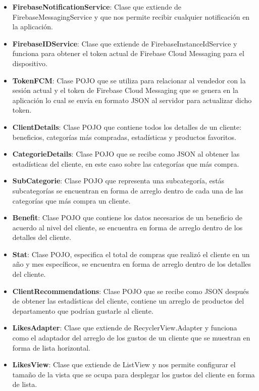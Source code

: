 \begin{itemize}
\item \textbf{FirebaseNotificationService}: Clase que extiende de FirebaseMessagingService y que nos permite recibir cualquier notificación en la aplicación.
\item \textbf{FirebaseIDService}: Clase que extiende de FirebaseInstanceIdService y funciona para obtener el token actual de Firebase Cloud Messaging para el dispositivo.
\item \textbf{TokenFCM}: Clase POJO que se utiliza para relacionar al vendedor con la sesión actual y el token de Firebase Cloud Messaging que se genera en la aplicación lo cual se envía en formato JSON al servidor para actualizar dicho token.
\item \textbf{ClientDetails}: Clase POJO que contiene todos los detalles de un cliente: beneficios, categorías más compradas, estadísticas y productos favoritos.
\item \textbf{CategorieDetails}: Clase POJO que se recibe como JSON al obtener las estadísticas del cliente, en este caso sobre las categorías que más compra. 
\item \textbf{SubCategorie}: Clase POJO que representa una subcategoría, estás subcategorías se encuentran en forma de arreglo dentro de cada una de las categorías que más compra un cliente.
\item \textbf{Benefit}: Clase POJO que contiene los datos necesarios de un beneficio de acuerdo al nivel del cliente, se encuentra en forma de arreglo dentro de los detalles del cliente.
\item \textbf{Stat}: Clase POJO, especifica el total de compras que realizó el cliente en un año y mes específicos, se encuentra en forma de arreglo dentro de los detalles del cliente. 
\item \textbf{ClientRecommendations}: Clase POJO que se recibe como JSON después de obtener las estadísticas del cliente, contiene un arreglo de productos del departamento que podrían gustarle al cliente.
\item \textbf{LikesAdapter}: Clase que extiende de RecyclerView.Adapter y funciona como el adaptador del arreglo de los gustos de un cliente que se muestran en forma de lista horizontal.
\item \textbf{LikesView}: Clase que extiende de ListView y nos permite configurar el tamaño de la vista que se ocupa para desplegar los gustos del cliente en forma de lista.
\end{itemize}

